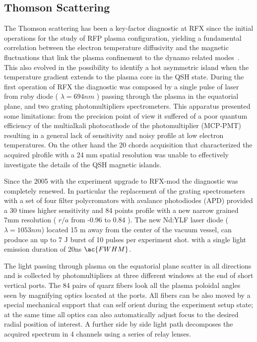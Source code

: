 \subsection{Thomson Scattering}
The Thomson scattering  has been a key-factor diagnostic at RFX since the initial operations for the study of RFP plasma configuration, yielding a fundamental correlation between the electron temperature diffusivity and the magnetic fluctuations that link the plasma confinement to the dynamo related modes~\cite{}. This also evolved in the possibility to identify a hot asymmetric island when the temperature gradient extends to the plasma core in the \ac{QSH} state.
During the first operation of RFX the diagnostic was composed by a single pulse of laser from ruby diode ( $\lambda = 694 nm$ ) passing through the plasma in the equatorial plane, and two grating photomultipliers spectrometers.
This apparatus presented some limitations: from the precision point of view it suffered of a poor quantum efficiency of the multialkali photocathode of the photomultiplier (MCP-PMT) resulting in a general lack of sensitivity and noisy profile at low electron temperatures. On the other hand the 20 chords acquisition that characterized the acquired plrofile with a 24 mm spatial resolution was unable to effectively investigate the details of the QSH magnetic islands.

Since the 2005 with the experiment upgrade to RFX-mod the diagnostic was completely renewed. In particular the replacement of the grating spectrometers with a set of four filter polycromators with avalance photodiodes (APD) provided a 30 times higher sensitivity and 84 points profile with a new narrow grained 7mm resolution ( $r/a$ from -0.96 to 0.84 ).
The new Nd:YLF laser diode ($\lambda=1053 nm$) located 15 m away from the center of the vacuum vessel, can produce an up to 7 J burst of 10 pulses per experiment shot. with a single light emission duration of 20ns $\ac{FWHM}$.

The light passing through plasma on the equatorial plane scatter in all directions and is collected by photomultipliers at three different windows at the end of short vertical ports. The 84 pairs of quarz fibers look all the plasma poloidal angles seen by magnifying optics located at the ports. All fibers can be also moved by a special mechanical support that can self orient during the experiment setup state; at the same time all optics can also automatically adjust focus to the desired radial position of interest.
A further side by side light path decomposes the acquired spectrum in 4 channels using a series of relay lenses.

